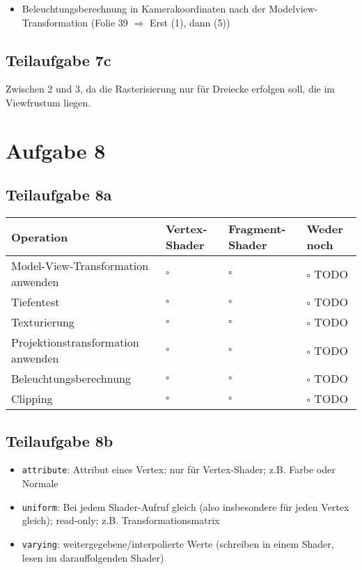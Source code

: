\documentclass[a4paper]{scrartcl}
\begin{document}
\begin{itemize}
    \item Beleuchtungsberechnung in Kamerakoordinaten nach der
          Modelview-Transformation (Folie 39 $\Rightarrow$ Erst (1), dann (5))
\end{itemize}

\subsection*{Teilaufgabe 7c}
Zwischen 2 und 3, da die Rasterisierung nur für Dreiecke erfolgen soll, die
im Viewfrustum liegen.

\section*{Aufgabe 8}
\subsection*{Teilaufgabe 8a}
\begin{tabular}{p{8cm}p{1.5cm}p{1.5cm}p{1.5cm}}\toprule
Operation                          & Vertex-Shader & Fragment-Shader & Weder noch \\\midrule
Model-View-Transformation anwenden & $\square$     & $\square$       & $\square$ TODO\\ %
Tiefentest                         & $\square$     & $\square$       & $\square$ TODO\\
Texturierung                       & $\square$     & $\square$       & $\square$ TODO\\
Projektionstransformation anwenden & $\square$     & $\square$       & $\square$ TODO\\
Beleuchtungsberechnung             & $\square$     & $\square$       & $\square$ TODO\\
Clipping                           & $\square$     & $\square$       & $\square$ TODO\\\bottomrule
\end{tabular}

\subsection*{Teilaufgabe 8b}
\begin{itemize}
    \item \texttt{attribute}: Attribut eines Vertex; nur für Vertex-Shader; z.B. Farbe oder Normale
    \item \texttt{uniform}: Bei jedem Shader-Aufruf gleich (also insbesondere für jeden Vertex gleich); read-only; z.B. Transformationsmatrix
    \item \texttt{varying}: weitergegebene/interpolierte Werte (schreiben in einem Shader, lesen im darauffolgenden Shader)
\end{itemize}
\end{document}
